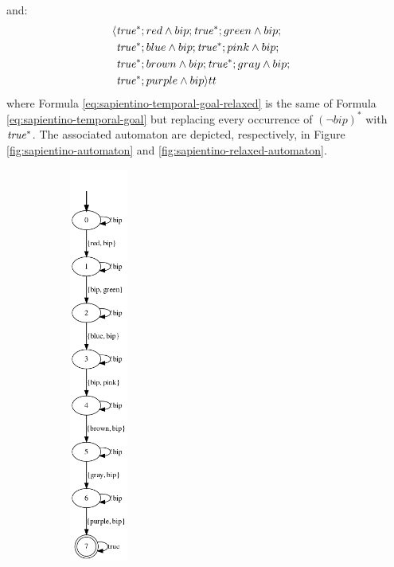 and: 
\begin{align}\label{eq:sapientino-temporal-goal-relaxed}
\langle &\mathit{true}^*;red \wedge bip;\mathit{true}^*;green \wedge bip;& \nonumber\\
	&\mathit{true}^*;blue \wedge bip;\mathit{true}^*;pink \wedge bip;& \nonumber\\
	&\mathit{true}^*;brown \wedge bip;\mathit{true}^*;gray \wedge bip;&\nonumber\\
	&\mathit{true}^*;purple \wedge bip \rangle tt
\end{align}
where Formula \ref{eq:sapientino-temporal-goal-relaxed} is the same of Formula \ref{eq:sapientino-temporal-goal} but replacing every occurrence of  $(\lnot bip)^*$ with $\mathit{true}^*$. The associated automaton are depicted, respectively, in Figure \ref{fig:sapientino-automaton} and \ref{fig:sapientino-relaxed-automaton}.
\begin{figure}[h]
	\begin{subfigure}{0.5\textwidth}
		\centering
		\includegraphics[width=0.21\textwidth]{images/sapientino_ldlf.png}

\end{subfigure}
\end{figure}
